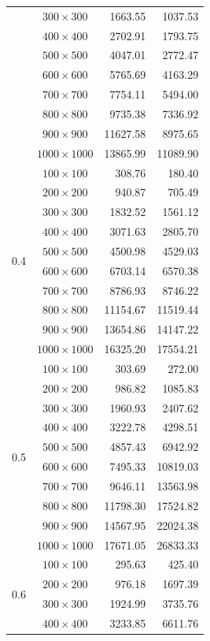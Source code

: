 \documentclass{article}
\begin{document}
\begin{longtable}{|c|c|r|r|}
&$300\times300$ & 1663.55 & 1037.53\\*
&$400\times400$ & 2702.91 & 1793.75\\*
&$500\times500$ & 4047.01 & 2772.47\\*
&$600\times600$ & 5765.69 & 4163.29\\*
&$700\times700$ & 7754.11 & 5494.00\\*
&$800\times800$ & 9735.38 & 7336.92\\*
&$900\times900$ & 11627.58 & 8975.65\\*
&$1000\times1000$ & 13865.99 & 11089.90\\
\hline
\multirow{10}{*}{0.4}
&$100\times100$ & 308.76 & 180.40\\*
&$200\times200$ & 940.87 & 705.49\\*
&$300\times300$ & 1832.52 & 1561.12\\*
&$400\times400$ & 3071.63 & 2805.70\\*
&$500\times500$ & 4500.98 & 4529.03\\*
&$600\times600$ & 6703.14 & 6570.38\\*
&$700\times700$ & 8786.93 & 8746.22\\*
&$800\times800$ & 11154.67 & 11519.44\\*
&$900\times900$ & 13654.86 & 14147.22\\*
&$1000\times1000$ & 16325.20 & 17554.21\\
\hline
\multirow{10}{*}{0.5}
&$100\times100$ & 303.69 & 272.00\\*
&$200\times200$ & 986.82 & 1085.83\\*
&$300\times300$ & 1960.93 & 2407.62\\*
&$400\times400$ & 3222.78 & 4298.51\\*
&$500\times500$ & 4857.43 & 6942.92\\*
&$600\times600$ & 7495.33 & 10819.03\\*
&$700\times700$ & 9646.11 & 13563.98\\*
&$800\times800$ & 11798.30 & 17524.82\\*
&$900\times900$ & 14567.95 & 22024.38\\*
&$1000\times1000$ & 17671.05 & 26833.33\\
\hline
\multirow{10}{*}{0.6}
&$100\times100$ & 295.63 & 425.40\\*
&$200\times200$ & 976.18 & 1697.39\\*
&$300\times300$ & 1924.99 & 3735.76\\*
&$400\times400$ & 3233.85 & 6611.76\\*

\end{longtable}
\end{document}
